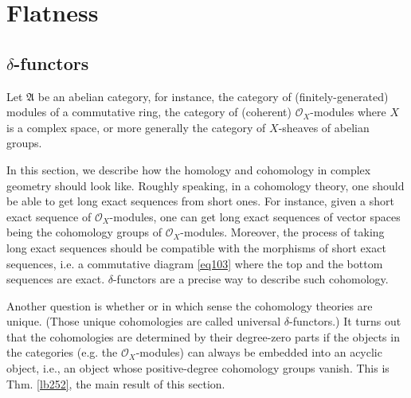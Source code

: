 \documentclass[12pt,b5paper,notitlepage]{report}
\theoremstyle{definition}
\theoremstyle{plain}
\newcommand{\fk}{\mathfrak}
\newcommand{\scr}{\mathscr}
\numberwithin{equation}{section}
\begin{document}
\chapter{Flatness}




\section{$\delta$-functors}



Let $\fk A$ be an abelian category, for instance, the category of (finitely-generated) modules of a commutative ring,  the category of (coherent) $\scr O_X$-modules where $X$ is a complex space, or more generally the category of $X$-sheaves of abelian groups.



In this section, we describe how the homology and cohomology in complex geometry should look like. Roughly speaking, in a cohomology theory, one should be able to get long exact sequences from short ones. For instance, given a short exact sequence of $\scr O_X$-modules, one can get long exact sequences of vector spaces being the cohomology groups of $\scr O_X$-modules. Moreover, the process of taking long exact sequences should be compatible with the morphisms of short exact sequences, i.e.  a commutative diagram \eqref{eq103} where the top and the bottom sequences are exact. $\delta$-functors are a precise way to describe such cohomology. 

Another question is whether or  in which sense the cohomology theories are unique. (Those unique cohomologies are called universal $\delta$-functors.) It turns out that the cohomologies are determined by their degree-zero parts if the objects in the categories (e.g. the $\scr O_X$-modules) can always be embedded into an acyclic object, i.e., an object whose positive-degree cohomology groups vanish. This is Thm. \ref{lb252}, the main result of this section.
\end{document}
